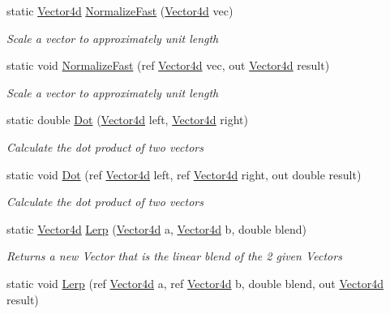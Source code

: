 \begin{DoxyCompactItemize}
static \hyperlink{struct_open_t_k_1_1_vector4d}{Vector4d} \hyperlink{struct_open_t_k_1_1_vector4d_ab3f6f989622184d18bc60b96bbe5b23d}{Normalize\-Fast} (\hyperlink{struct_open_t_k_1_1_vector4d}{Vector4d} vec)
\begin{DoxyCompactList}\small\item\em Scale a vector to approximately unit length \end{DoxyCompactList}\item 
static void \hyperlink{struct_open_t_k_1_1_vector4d_afacb02c7ab592ddbfbffbcca4a181363}{Normalize\-Fast} (ref \hyperlink{struct_open_t_k_1_1_vector4d}{Vector4d} vec, out \hyperlink{struct_open_t_k_1_1_vector4d}{Vector4d} result)
\begin{DoxyCompactList}\small\item\em Scale a vector to approximately unit length \end{DoxyCompactList}\item 
static double \hyperlink{struct_open_t_k_1_1_vector4d_aff20652d93a896e2e4ca242b7d40ea07}{Dot} (\hyperlink{struct_open_t_k_1_1_vector4d}{Vector4d} left, \hyperlink{struct_open_t_k_1_1_vector4d}{Vector4d} right)
\begin{DoxyCompactList}\small\item\em Calculate the dot product of two vectors \end{DoxyCompactList}\item 
static void \hyperlink{struct_open_t_k_1_1_vector4d_a92ba23b1c23dd3dac0ed61b7ec664ed2}{Dot} (ref \hyperlink{struct_open_t_k_1_1_vector4d}{Vector4d} left, ref \hyperlink{struct_open_t_k_1_1_vector4d}{Vector4d} right, out double result)
\begin{DoxyCompactList}\small\item\em Calculate the dot product of two vectors \end{DoxyCompactList}\item 
static \hyperlink{struct_open_t_k_1_1_vector4d}{Vector4d} \hyperlink{struct_open_t_k_1_1_vector4d_ac6a2b0348705fc9101d93670b0130717}{Lerp} (\hyperlink{struct_open_t_k_1_1_vector4d}{Vector4d} a, \hyperlink{struct_open_t_k_1_1_vector4d}{Vector4d} b, double blend)
\begin{DoxyCompactList}\small\item\em Returns a new Vector that is the linear blend of the 2 given Vectors \end{DoxyCompactList}\item 
static void \hyperlink{struct_open_t_k_1_1_vector4d_a5d571a92a9058c8b2661488c9e034fb9}{Lerp} (ref \hyperlink{struct_open_t_k_1_1_vector4d}{Vector4d} a, ref \hyperlink{struct_open_t_k_1_1_vector4d}{Vector4d} b, double blend, out \hyperlink{struct_open_t_k_1_1_vector4d}{Vector4d} result)

\end{DoxyCompactItemize}
